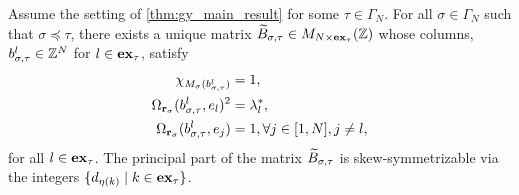 \begin{lemma}\label{lem:inductive_columns}
	Assume the setting of \cref{thm:gy_main_result} for some $\tau \in \Gamma_N$. For all $\sigma \in \Gamma_N$ such that $\sigma \preceq \tau$, there exists a unique matrix $\widetilde{B}_{\sigma, \tau}\in M_{N \times \mathbf{ex}_\tau} (\mathbb{Z})$ whose columns, $b^l_{\sigma, \tau} \in \mathbb{Z}^N$ for $l\in \mathbf{ex}_\tau$, satisfy
	\begin{equation}\label{eq:conditions_for_blsigmatau}
		\begin{aligned}
			\chi_{M_\sigma(b^l_{\sigma, \tau})}            & = 1,                                \\
			\Omega_{\mathbf{r}_\sigma}(b^l_{\sigma,\tau}, e_l)^2 & = \lambda^*_l,                      \\
			\Omega_{\mathbf{r}_\sigma}(b^l_{\sigma,\tau}, e_j)   & = 1, \forall j \in [1, N], j\neq l,
		\end{aligned}
	\end{equation}
	for all $l \in \mathbf{ex}_\tau$. The principal part of the matrix $\widetilde{B}_{\sigma, \tau}$ is
	skew-symmetrizable via the integers $\{d_{\eta(k)} \mid k \in \mathbf{ex}_\tau\}$.
\end{lemma}
